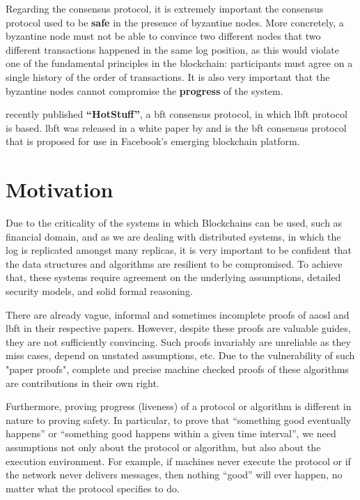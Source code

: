 Regarding the consensus protocol, it is extremely important the consensus protocol used to be \textbf{safe} in the presence of byzantine nodes. More concretely, a byzantine node must not be able to convince two different nodes that two different transactions happened in the same log position, as this would violate one of the fundamental principles in the blockchain: participants must agree on a single history of the order of transactions.
It is also very important that the byzantine nodes cannot compromise the \textbf{progress} of the system. 

\cite{hotstuff} recently published \textbf{``HotStuff''}, a \gls{bft} consensus protocol, in which \gls{lbft} protocol is based.  \gls{lbft} was released in a white paper by \cite{libra} and is the \gls{bft} consensus protocol that is proposed for use in Facebook's emerging blockchain platform.

\section{Motivation}
Due to the criticality of the systems in which Blockchains can be used, such as financial domain, and as we are dealing with distributed systems, in which the log is replicated amongst many replicas, it is very important to be confident that the data structures and algorithms are resilient to be compromised. To achieve that, these systems require agreement on the underlying assumptions, detailed security models, and solid formal reasoning. 

There are already vague, informal and sometimes incomplete proofs of \gls{aaosl} and \gls{lbft} in their respective papers. However, despite these proofs are valuable guides, they are not  sufficiently convincing. Such proofs invariably are unreliable as they miss cases, depend on unstated assumptions, etc. Due to the vulnerability of such "paper proofs", complete and precise machine checked proofs of these algorithms are contributions in their own right.

Furthermore, proving progress (liveness) of a protocol or algorithm is different in nature to proving safety. In particular, to prove that ``something good eventually happens'' or ``something good happens within a given time interval'', we need assumptions not 
only about the protocol or algorithm, but also about the execution environment. 
For example, if machines never execute the protocol or if the network never delivers messages, then nothing ``good'' will ever happen, no matter what the protocol specifies to do. 

